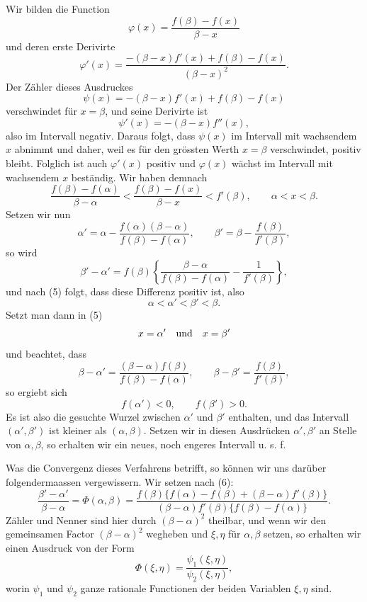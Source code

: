 \documentclass[11pt]{article}
\begin{document}
Wir bilden die Function
\[
        \varphi(x)=\frac{f(\beta)-f(x)}{\beta-x}
\]
und deren erste Derivirte
\[
        \varphi'(x)=
        \frac{-(\beta-x)f'(x)+f(\beta)-f(x)}{(\beta-x)^2}.
\]
Der Zähler dieses Ausdruckes
\[
        \psi(x)=-(\beta-x)f'(x)+f(\beta)-f(x)
\]
verschwindet für $x=\beta$, und seine Derivirte ist
\[
        \psi'(x)=-(\beta-x)f''(x),
\]
also im Intervall negativ. Daraus folgt, dass $\psi(x)$ im Intervall mit wachsendem $x$ abnimmt und daher, weil es für den grössten Werth $x=\beta$ verschwindet, positiv bleibt. Folglich ist auch $\varphi'(x)$ positiv und $\varphi(x)$ wächst im Intervall mit wachsendem $x$ beständig. Wir haben demnach
\begin{equation}
        \frac{f(\beta)-f(\alpha)}{\beta-\alpha}
        <\frac{f(\beta)-f(x)}{\beta-x}
        <f'(\beta),\qquad \alpha<x<\beta.
\tag{5}
\end{equation}
Setzen wir nun
\[
        \alpha'=\alpha-\frac{f(\alpha)(\beta-\alpha)}{f(\beta)-f(\alpha)},
        \qquad
        \beta'=\beta-\frac{f(\beta)}{f'(\beta)},
\]
so wird
\begin{equation}
        \beta'-\alpha'=f(\beta)\left\{
        \frac{\beta-\alpha}{f(\beta)-f(\alpha)}-\frac1{f'(\beta)}
        \right\},
\tag{6}
\end{equation}
und nach (5) folgt, dass diese Differenz positiv ist, also
\[
        \alpha<\alpha'<\beta'<\beta.
\]
Setzt man dann in (5)
\[
        x=\alpha'\quad\hbox{und}\quad x=\beta'
\]
und beachtet, dass
\[
        \beta-\alpha'=\frac{(\beta-\alpha)f(\beta)}{f(\beta)-f(\alpha)},
        \qquad
        \beta-\beta'=\frac{f(\beta)}{f'(\beta)},
\]
so ergiebt sich
\[
        f(\alpha')<0,\qquad f(\beta')>0.
\]
Es ist also die gesuchte Wurzel zwischen $\alpha'$ und $\beta'$ enthalten, und das Intervall $(\alpha',\beta')$ ist kleiner als $(\alpha,\beta)$. Setzen wir in diesen Ausdrücken $\alpha',\beta'$ an Stelle von $\alpha,\beta$, so erhalten wir ein neues, noch engeres Intervall u. s. f.

Was die Convergenz dieses Verfahrens betrifft, so können wir uns darüber folgendermaassen vergewissern. Wir setzen nach (6):
\begin{equation}
        \frac{\beta'-\alpha'}{\beta-\alpha}
        =\Phi(\alpha,\beta)
        =\frac{f(\beta)\{f(\alpha)-f(\beta)+(\beta-\alpha)f'(\beta)\}}
        {(\beta-\alpha)f'(\beta)\{f(\beta)-f(\alpha)\}}.
\tag{7}
\end{equation}
Zähler und Nenner sind hier durch $(\beta-\alpha)^2$ theilbar, und wenn wir den gemeinsamen Factor $(\beta-\alpha)^2$ wegheben und $\xi,\eta$ für $\alpha,\beta$ setzen, so erhalten wir einen Ausdruck von der Form
\[
        \Phi(\xi,\eta)=\frac{\psi_1(\xi,\eta)}{\psi_2(\xi,\eta)},
\]
worin $\psi_1$ und $\psi_2$ ganze rationale Functionen der beiden Variablen $\xi,\eta$ sind.
\end{document}
